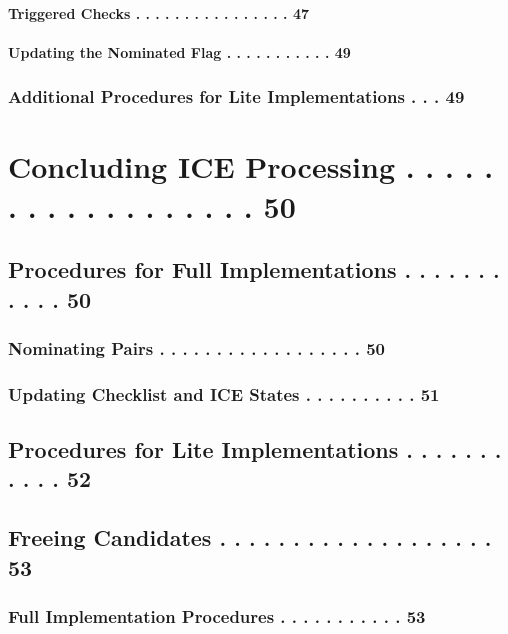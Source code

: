 \documentclass{article}
\begin{document}
\paragraph{Triggered Checks  . . . . . . . . . . . . . . . .  47}

\paragraph{Updating the Nominated Flag . . . . . . . . . . .  49}

\subsubsection{Additional Procedures for Lite Implementations  . . .  49}

\section{Concluding ICE Processing . . . . . . . . . . . . . . . . . .  50}

\subsection{Procedures for Full Implementations . . . . . . . . . . .  50}

\subsubsection{Nominating Pairs  . . . . . . . . . . . . . . . . . .  50}

\subsubsection{Updating Checklist and ICE States . . . . . . . . . .  51}

\subsection{Procedures for Lite Implementations . . . . . . . . . . .  52}

\subsection{Freeing Candidates  . . . . . . . . . . . . . . . . . . .  53}

\subsubsection{Full Implementation Procedures  . . . . . . . . . . .  53}
\end{document}

